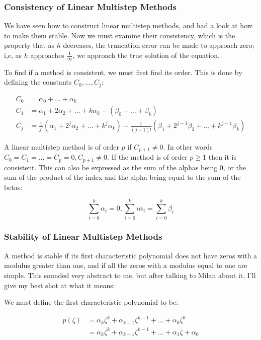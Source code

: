 \subsubsection{Consistency of Linear Multistep Methods}

We have seen how to construct linear multistep methods, and had a look
at how to make them stable. Now we must examine their consistency,
which is the property that as $h$ decreases, the truncation error can
be made to approach zero; i,e, as $h$ approaches
$\frac{1}{\infty}$, we approach the true solution of the equation.

To find if a method is consistent, we must first find its order. This
is done by defining the constants $C_0, \dots, C_j$:

\[
\begin{split}
C_0 &= \alpha_0 + \dots + \alpha_k\\
C_1 &= \alpha_1 + 2\alpha_2 + \dots + k\alpha_k - (\beta_0 + \dots
+ \beta_k)\\
C_j &= \frac{1}{j!}(\alpha_1 + 2^j\alpha_2 + \dots + k^j\alpha_k)
- \frac{1}{(j-1)!}(\beta_1 + 2^{j-1}\beta_2 + \dots + k^{j-1}\beta_k)
\end{split}
\]

A linear multistep method is of order $p$ if $C_{p+1} \neq 0$. In
other words $C_0 = C_1 = \dots = C_p = 0, C_{p+1} \neq 0$. If the
method is of order $p \geq 1$ then it is consistent. This can also be
expressed as the sum of the alphas being $0$, or the sum of the
product of the index and the alpha being equal to the sum of the
betas:

\[
  \sum\limits^k_{i=0}\alpha_i = 0, \sum\limits^k_{i=0}i\alpha_i
    = \sum\limits^k_{i=0}\beta_i
\]

\subsubsection{Stability of Linear Multistep Methods}

A method is stable if its first characteristic polynomial does not
have zeros with a modulus greater than one, and if all the zeros with
a modulus equal to one are simple. This sounded very abstract to me,
but after talking to Milan about it, I'll give my best shot at what it
means:

We must define the first characteristic polynomial to be:

\[
\begin{split}
  p(\zeta) &= \alpha_k\zeta^k + \alpha_{k-1}\zeta^{k-1} + \dots
  + \alpha_0\zeta^0\\
           &= \alpha_k\zeta^k + \alpha_{k-1}\zeta^{k-1} + \dots
  + \alpha_1\zeta + \alpha_0\\
\end{split}
\]

